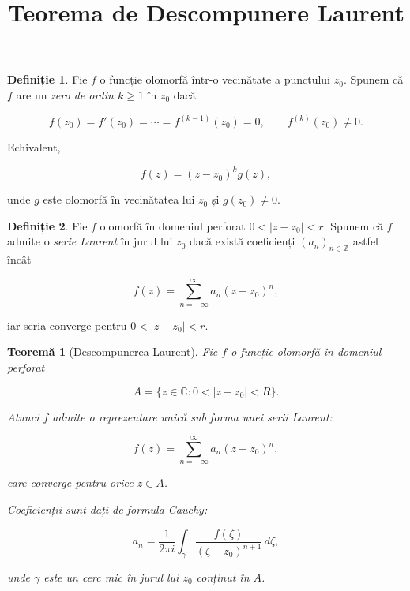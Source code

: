 \documentclass[12pt]{article}
\title{Teorema de Descompunere Laurent}
\author{}
\date{}
\theoremstyle{definition}
\newtheorem{definition}{Definiție}
\theoremstyle{plain}
\newtheorem{theorem}{Teoremă}
\begin{document}
\maketitle

\begin{definition}
Fie $f$ o funcție olomorfă într-o vecinătate a punctului $z_0$. Spunem că $f$ are un
\emph{zero de ordin $k \ge 1$} în $z_0$ dacă


\[
f(z_0) = f'(z_0) = \cdots = f^{(k-1)}(z_0) = 0, 
\qquad f^{(k)}(z_0) \ne 0.
\]


Echivalent,


\[
f(z) = (z - z_0)^k g(z),
\]


unde $g$ este olomorfă în vecinătatea lui $z_0$ și $g(z_0) \ne 0$.
\end{definition}

\begin{definition}
Fie $f$ olomorfă în domeniul perforat $0 < |z - z_0| < r$. Spunem că $f$ admite o
\emph{serie Laurent} în jurul lui $z_0$ dacă există coeficienți $(a_n)_{n \in \mathbb{Z}}$ astfel încât


\[
f(z) = \sum_{n=-\infty}^{\infty} a_n (z - z_0)^n,
\]


iar seria converge pentru $0 < |z - z_0| < r$.
\end{definition}

\begin{theorem}[Descompunerea Laurent]
Fie $f$ o funcție olomorfă în domeniul perforat


\[
A = \{ z \in \mathbb{C} : 0 < |z - z_0| < R \}.
\]


Atunci $f$ admite o reprezentare unică sub forma unei serii Laurent:


\[
f(z) = \sum_{n=-\infty}^{\infty} a_n (z - z_0)^n,
\]


care converge pentru orice $z \in A$.

Coeficienții sunt dați de formula Cauchy:


\[
a_n = \frac{1}{2\pi i} \int_{\gamma} \frac{f(\zeta)}{(\zeta - z_0)^{n+1}} \, d\zeta,
\]


unde $\gamma$ este un cerc mic în jurul lui $z_0$ conținut în $A$.
\end{theorem}
\end{document}
